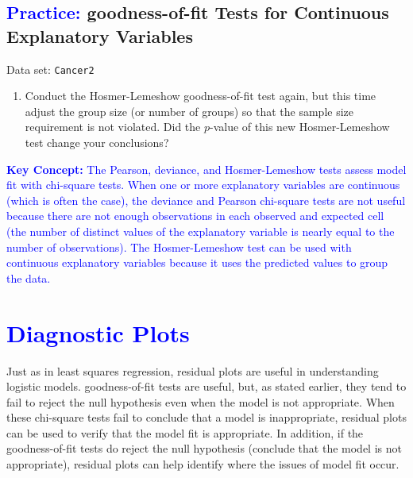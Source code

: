 \documentclass[
]{report}
\providecommand{\tightlist}{%
  \setlength{\itemsep}{0pt}\setlength{\parskip}{0pt}}
\begin{document}
\hypertarget{goodness-of-fit-tests-for-continuous-explanatory-variables-1}{%
\subsection*{\texorpdfstring{\textcolor{blue}{Practice:} goodness-of-fit Tests for Continuous Explanatory Variables}{ goodness-of-fit Tests for Continuous Explanatory Variables}}\label{goodness-of-fit-tests-for-continuous-explanatory-variables-1}}

\vspace{-1em}

Data set: \texttt{Cancer2}

\begin{enumerate}
\def\labelenumi{\arabic{enumi}.}
\setcounter{enumi}{31}
\tightlist
\item
  Conduct the Hosmer-Lemeshow goodness-of-fit test again, but this time adjust the group size (or number of groups) so that the sample size requirement is not violated. Did the \(\scriptstyle p\)-value of this new Hosmer-Lemeshow test change your conclusions?
\end{enumerate}

\textbf{\textcolor{blue}{Key Concept:}}
\textcolor{blue}{The Pearson, deviance, and Hosmer-Lemeshow tests assess model fit with chi-square tests. When one or more explanatory variables are continuous (which is often the case), the deviance and Pearson chi-square tests are not useful because there are not enough observations in each observed and expected cell (the number of distinct values of the explanatory variable is nearly equal to the number of observations). The Hosmer-Lemeshow test can be used with continuous explanatory variables because it uses the predicted values to group the data. }

\hypertarget{section-74}{%
\section{\texorpdfstring{\textcolor{blue}{ Diagnostic Plots}}{}}\label{section-74}}

Just as in least squares regression, residual plots are useful in understanding logistic models. goodness-of-fit tests are useful, but, as stated earlier, they tend to fail to reject the null hypothesis even when the model is not appropriate. When these chi-square tests fail to conclude that a model is inappropriate, residual plots can be used to verify that the model fit is appropriate. In addition, if the goodness-of-fit tests do reject the null hypothesis (conclude that the model is not appropriate), residual plots can help identify where the issues of model fit occur.
\end{document}
